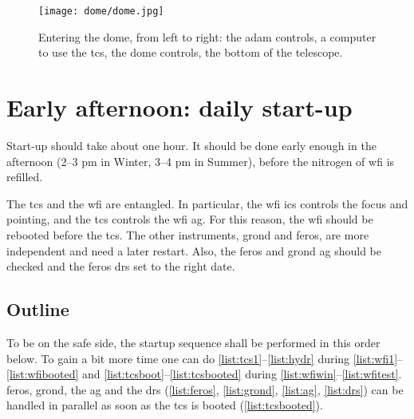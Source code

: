 \documentclass[11pt,fleqn]{book} %
\begin{document}
\begin{figure}[!ht]
\texttt{[image: dome/dome.jpg]}
\caption[Entering the dome]{Entering the dome, from left to right: the \gls{adam} controls,
a computer to use the \gls{tcs}, the dome controls, the bottom of the telescope.}
\label{fig:dome}
\end{figure}

\cleardoublepage



%                                       
%                                  
%
%


\chapter{Early afternoon: daily start-up}
\label{startup}

Start-up should take about one hour.  It should be done early enough in the
afternoon (2--3 pm in Winter, 3--4 pm in Summer), before the nitrogen of
\gls{wfi} is refilled. 

The \gls{tcs} and the \gls{wfi} are entangled.  In particular, the \gls{wfi}
\gls{ics} controls the focus and pointing, and the \gls{tcs} controls the
\gls{wfi} \gls{ag}.  For this reason, the \gls{wfi} should be rebooted before
the \gls{tcs}.  The other instruments, \gls{grond} and \gls{feros}, are more
independent and need a later restart. Also, the \gls{feros} and \gls{grond}
\gls{ag} should be checked and the \gls{feros} \gls{drs} set to the right
date.

\section{Outline}

To be on the safe side, the startup sequence shall be performed in this order
below. To gain a bit more time one can do \ref{list:tcs1}--\ref{list:hydr}
during \ref{list:wfi1}--\ref{list:wfibooted} and
\ref{list:tcsboot}--\ref{list:tcsbooted} during
\ref{list:wfiwin}--\ref{list:wfitest}.  \gls{feros}, \gls{grond}, the
\gls{ag} and the \gls{drs} (\ref{list:feros}, \ref{list:grond}, \ref{list:ag},
\ref{list:drs}) can be handled in parallel as soon as the \gls{tcs} is booted
(\ref{list:tcsbooted}).
\end{document}
